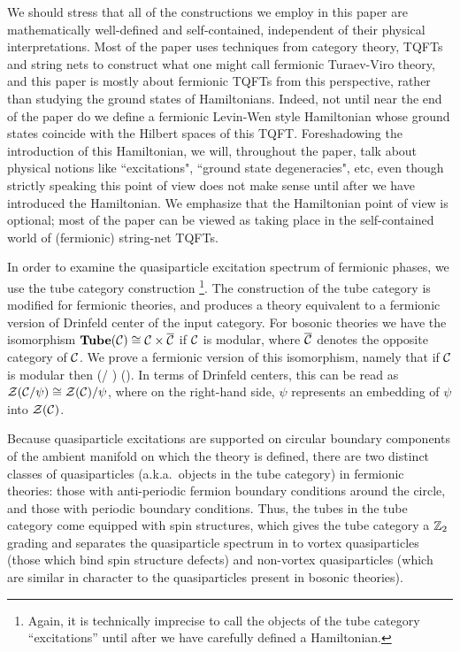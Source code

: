 We should stress that all of the constructions we employ in this paper are mathematically well-defined and 
self-contained, independent of their physical interpretations. 
Most of the paper uses techniques from category theory, TQFTs and string nets to construct what one
might call fermionic Turaev-Viro theory, and this paper is mostly about fermionic TQFTs from this perspective, 
rather than studying the ground states of Hamiltonians. 
Indeed, not until near the end of the paper do we define a fermionic Levin-Wen style Hamiltonian whose ground states coincide with 
the Hilbert spaces of this TQFT.
Foreshadowing the introduction of this Hamiltonian, we will, throughout the paper, talk about physical notions like ``excitations", ``ground state degeneracies", 
etc, even though
strictly speaking this point of view does not make sense until after we have introduced the Hamiltonian.
We emphasize that the Hamiltonian point of view is optional; most of the paper can be viewed as taking place
in the self-contained world of (fermionic) string-net TQFTs.

In order to examine the quasiparticle excitation spectrum of fermionic phases, 
we use the tube category construction \cite{ocneanu1994}\footnote{Again, it is technically imprecise to call the objects 
of the tube category ``excitations'' until after we have carefully defined a Hamiltonian.}.
The construction of the tube category is modified for fermionic theories, and produces a theory
equivalent to a fermionic version of Drinfeld center of the input category.
For bosonic theories we have the isomorphism $\textbf{Tube}(\mathcal{C})\cong\mathcal{C}\times\overline{\mathcal{C}}$ \cite{muger2003b} if $\mathcal{C}$ is modular, where $\overline{\mathcal{C}}$ denotes the opposite category of $\mathcal{C}$.
We prove a fermionic version of this isomorphism, namely that 
if $\mathcal{C}$ is modular then 
\be 
	\tube(\mcc / \psi) \cong \mcc \times (\overline{\mcc / \psi}).
\ee
In terms of Drinfeld centers, this can be read as $\mathcal{Z}(\mathcal{C} / \psi)\cong \mathcal{Z}(\mathcal{C})/\psi$, where on the right-hand side, 
$\psi$ represents an embedding of $\psi$ into $\mathcal{Z}(\mathcal{C})$.


Because quasiparticle excitations are supported on circular boundary components of the ambient 
manifold on which the theory is defined, there are two distinct classes of quasiparticles (a.k.a.\ objects in the tube category) in 
fermionic theories: those with anti-periodic fermion boundary conditions around the circle, and 
those with periodic boundary conditions. 
Thus, the tubes in the tube category come equipped with spin structures, which gives the tube category a $\mathbb{Z}_2$ grading
and separates the quasiparticle spectrum in to vortex quasiparticles (those which bind spin structure defects) 
and non-vortex quasiparticles (which are similar in character to the quasiparticles present in bosonic theories). 

